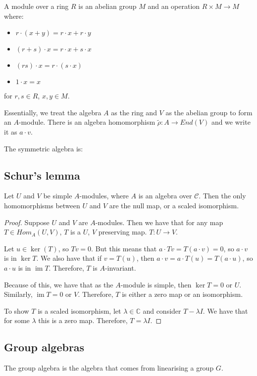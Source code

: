\documentclass[]{report}
\theoremstyle{definition}
\numberwithin{theorem}{section}
\numberwithin{equation}{section}
\newcommand{\im}{\operatorname{im}}
\begin{document}
A module over a ring $R$ is an abelian group $M$ and an operation $R \times M \rightarrow M$ where:
\begin{itemize}
	\item $r \cdot (x + y) = r \cdot x + r \cdot y$
	\item $(r + s) \cdot x = r \cdot x + s \cdot x$
	\item $(rs )\cdot x = r \cdot (s \cdot x)$
	\item $1 \cdot x = x$
\end{itemize}
for $r, s \in R$, $x, y \in M$.

Essentially, we treat the algebra $A$ as the ring and $V$ as the abelian group to form an $A$-module. There is an algebra homomorphism $\tilde{\rho}: A \rightarrow End(V)$ and we write it as $a \cdot v$. 

The symmetric algebra is:


\subsection{Schur's lemma}
Let $U$ and $V$ be simple $A$-modules, where $A$ is an algebra over $\mathcal{C}$. Then the only homomorphisms between $U$ and $V$ are the null map, or a scaled isomorphism.

\begin{proof}
	Suppose $U$ and $V$ are $A$-modules. Then we have that for any map $T \in Hom_A(U, V)$, $T$ is a $U$, $V$ preserving map. $T : U \rightarrow V$.
	
	Let $u \in \ker(T)$, so $T v = 0$. But this means that $a \cdot T v = T (a \cdot v) = 0$, so $a \cdot v$ is in $\ker T$. We also have that if $v = T (u)$, then $a \cdot v = a \cdot T(u) = T( a \cdot u)$, so $a \cdot u$ is in $\im T$. Therefore, $T$ is $A$-invariant.
	
	Because of this, we have that as the $A$-module is simple, then $\ker T = 0$ or $U$. Similarly, $\im T = 0$ or $V$. Therefore, $T$ is either a zero map or an isomorphism.
	
	To show $T$ is a scaled isomorphism, let $\lambda \in \mathbb{C}$ and consider $T - \lambda I$. We have that for some $\lambda$ this is a zero map. Therefore, $T = \lambda I$. 
\end{proof}

\subsection{Group algebras}

The group algebra is the algebra that comes from linearising a group $G$. 
\end{document}
